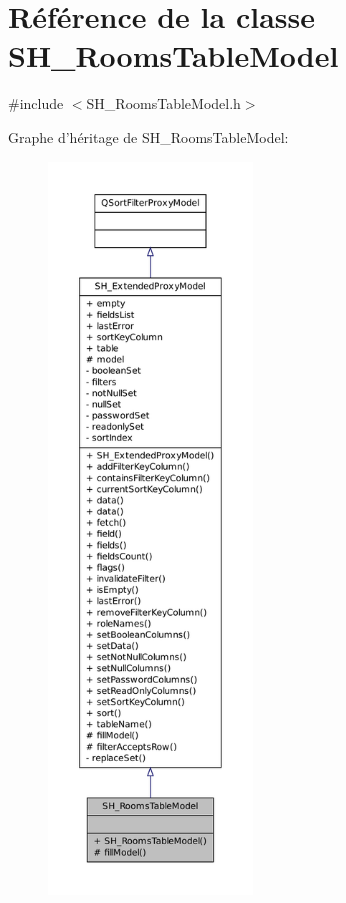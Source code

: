\hypertarget{classSH__RoomsTableModel}{\section{Référence de la classe S\-H\-\_\-\-Rooms\-Table\-Model}
\label{classSH__RoomsTableModel}
}


{\ttfamily \#include $<$S\-H\-\_\-\-Rooms\-Table\-Model.\-h$>$}



Graphe d'héritage de S\-H\-\_\-\-Rooms\-Table\-Model\-:
\nopagebreak
\begin{figure}[H]
\begin{center}
\leavevmode
\includegraphics[height=550pt]{classSH__RoomsTableModel__inherit__graph}
\end{center}
\end{figure}


